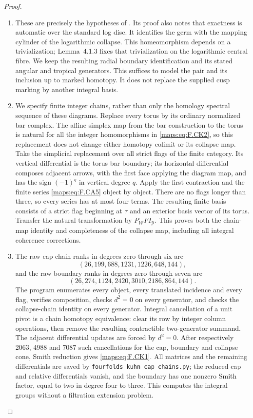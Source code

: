 \documentclass[11pt,a4paper]{article}
\theoremstyle{definition}
\begin{document}
\begin{proof}
\begin{enumerate}[label=\arabic*.]
\item These are precisely the hypotheses of
\cite[Theorem~4.1.1, pp.~480--482]{ffAchingerOgus20}.
Its proof also notes that exactness is automatic over the
standard log disc.  It identifies the germ with the mapping
cylinder of the logarithmic collapse.  This homeomorphism
depends on a trivialization; Lemma~4.1.3 fixes that
trivialization on the logarithmic central fibre.  We keep
the resulting radial boundary identification and its stated
angular and tropical generators.  This suffices to model
the pair and its inclusion up to marked homotopy.  It does
not replace the supplied cusp marking by another integral
basis.

\item We specify finite integer chains, rather than only the
homology spectral sequence of these diagrams.  Replace every
torus by its ordinary normalized bar complex.  The affine
simplex map from the bar construction to the torus is natural
for all the integer homomorphisms in \eqref{maps:eq:F.CK2}, so this replacement
does not change either homotopy colimit or its collapse map.
Take the simplicial replacement over all strict flags of the
finite category.  Its vertical differential is the torus bar
boundary; its horizontal differential composes adjacent
arrows, with the first face applying the diagram map, and
has the sign $(-1)^q$ in vertical degree $q$.
Apply the first contraction and the finite series \eqref{maps:eq:F.CA5}
object by object.  There are no flags longer than three,
so every series has at most four terms.  The resulting
finite basis consists of a strict flag beginning at $\tau$
and an exterior basis vector of its torus.  Transfer the
natural transformation by $P_{\mathcal W}FI_{\mathcal Y}$.
This proves both the chain-map identity and completeness of
the collapse map, including all integral coherence corrections.

\item The raw cap chain ranks in degrees zero through six are
\[
 (26,199,688,1231,1226,648,144),
\]
and the raw boundary ranks in degrees zero through seven are
\[
 (26,274,1124,2420,3010,2186,864,144).
\]
The program enumerates every object, every translated
incidence and every flag, verifies composition, checks
$d^2=0$ on every generator, and checks the collapse-chain
identity on every generator.  Integral cancellation of a
unit pivot is a chain homotopy equivalence: clear its row by
integer column operations, then remove the resulting
contractible two-generator summand.  The adjacent differential
updates are forced by $d^2=0$.  After respectively 2063,
4988 and 7087 such cancellations for the cap, boundary and
collapse cone, Smith reduction gives \eqref{maps:eq:F.CK1}.  All matrices
and the remaining differentials are saved by
\texttt{fourfolds\_kuhn\_cap\_chains.py}; the reduced cap and
relative differentials vanish, and the boundary has one
nonzero Smith factor, equal to two in degree four to three.
This computes the integral groups without a filtration
extension problem.
\end{enumerate}
\end{proof}
\end{document}
